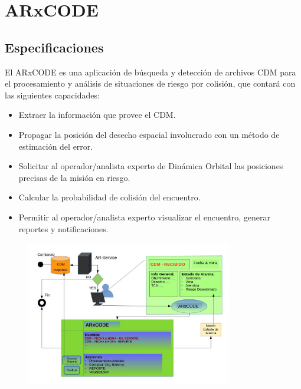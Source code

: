 \chapter{ARxCODE}
\label{chap:arxcode} 

\section{Especificaciones}
El ARxCODE es una aplicaci\'on de b\'usqueda y detecci\'on de archivos CDM para el procesamiento y an\'alisis de situaciones de riesgo por colisi\'on, que contar\'a con las siguientes capacidades:

\begin{itemize}
\item Extraer la informaci\'on que provee el CDM.
\item Propagar la posici\'on del desecho espacial involucrado con un m\'etodo de estimaci\'on del error.
\item Solicitar al operador/analista experto de Din\'amica Orbital las posiciones precisas de la misi\'on en riesgo.
\item Calcular la probabilidad de colisi\'on del encuentro.
\item Permitir al operador/analista experto visualizar el encuentro, generar reportes y notificaciones.
\end{itemize} 


\begin{figure}[!h]
  \centering
  \includegraphics[width=0.8\textwidth]{imagenes/ARprocedimiento}
\end{figure}

